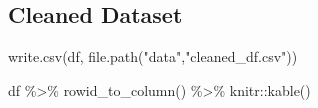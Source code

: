 \documentclass[
  letterpaper,
  DIV=11,
  numbers=noendperiod]{scrartcl}
\newenvironment{Shaded}{\begin{snugshade}}{\end{snugshade}}
\newcommand{\FunctionTok}[1]{\textcolor[rgb]{0.28,0.35,0.67}{#1}}
\newcommand{\NormalTok}[1]{\textcolor[rgb]{0.00,0.23,0.31}{#1}}
\newcommand{\SpecialCharTok}[1]{\textcolor[rgb]{0.37,0.37,0.37}{#1}}
\newcommand{\StringTok}[1]{\textcolor[rgb]{0.13,0.47,0.30}{#1}}
\begin{document}
\subsection{Cleaned Dataset}\label{cleaned-dataset}

\begin{Shaded}
\begin{Highlighting}[]
\FunctionTok{write.csv}\NormalTok{(df, }\FunctionTok{file.path}\NormalTok{(}\StringTok{"data"}\NormalTok{,}\StringTok{"cleaned\_df.csv"}\NormalTok{))}

\NormalTok{df }\SpecialCharTok{\%\textgreater{}\%}
   \FunctionTok{rowid\_to\_column}\NormalTok{() }\SpecialCharTok{\%\textgreater{}\%}
\NormalTok{   knitr}\SpecialCharTok{::}\FunctionTok{kable}\NormalTok{()}
\end{Highlighting}
\end{Shaded}
\end{document}
